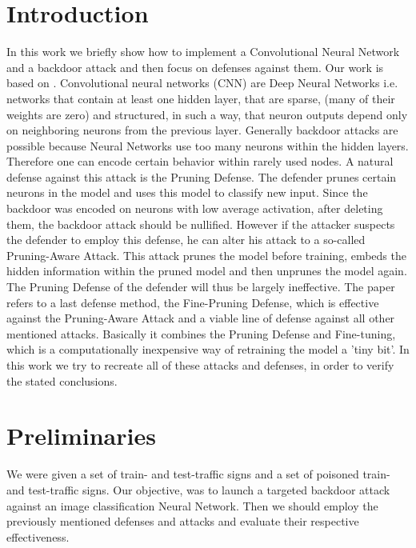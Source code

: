 \documentclass[a4paper,12pt]{report}
\begin{document}
\section{Introduction}
In this work we briefly show how to implement a Convolutional Neural Network and a backdoor attack and then focus on defenses against them. Our work is based on \citep{paper}.
Convolutional neural networks (CNN)\label{CNN} are Deep Neural Networks i.e. networks that contain at least one hidden layer, that are sparse, (many of
their weights are zero) and structured, in such a way, that neuron outputs depend only on neighboring neurons from the previous layer. Generally backdoor attacks are possible because Neural Networks use too many neurons within the hidden layers. Therefore one can encode certain behavior within rarely used nodes. A natural defense against this attack is the Pruning Defense. The defender prunes certain neurons in the model and uses this model to classify new input. Since the backdoor was encoded on neurons with low average activation, after deleting them, the backdoor attack should be nullified. However if the attacker suspects the defender to employ this defense, he can alter his attack to a so-called Pruning-Aware Attack. This attack prunes the model before training, embeds the hidden information within the pruned model and then unprunes the model again. The Pruning Defense of the defender will thus be largely ineffective. The paper refers to a last defense method, the Fine-Pruning Defense, which is effective against the Pruning-Aware Attack and a viable line of defense against all other mentioned attacks. Basically it combines the Pruning Defense and Fine-tuning, which is a computationally inexpensive way of retraining the model a 'tiny bit'. In this work we try to recreate all of these attacks and defenses, in order to verify the stated conclusions. 

\section{Preliminaries}
We were given a set of train- and test-traffic signs and a set of poisoned train- and test-traffic signs. Our objective, was to launch a targeted backdoor attack against an image classification Neural Network. Then we should employ the previously mentioned defenses and attacks and evaluate their respective effectiveness.
\end{document}
